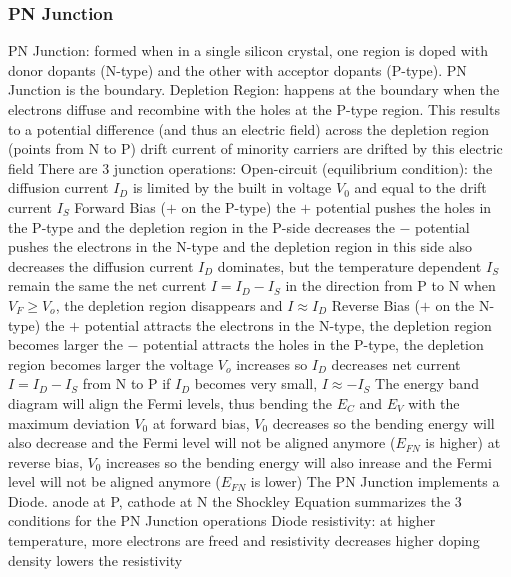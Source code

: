 \documentclass[a4paper,11pt]{article}
\begin{document}
 	\subsubsection{PN Junction}
 	\begin{outline}[enumerate]
 		\1 PN Junction: formed when in a single silicon crystal, one region is doped with donor dopants (N-type) and the other with acceptor dopants (P-type). PN Junction is the boundary.
 		\1 Depletion Region: happens at the boundary when the electrons diffuse and recombine with the holes at the P-type region. This results to a potential difference (and thus an electric field) across the depletion region (points from N to P)
 			\2 drift current of minority carriers are drifted by this electric field
 		\1 There are 3 junction operations:
 			\2 Open-circuit (equilibrium condition):
 				\3 the diffusion current $I_{D}$ is limited by the built in voltage $V_{0}$ and equal to the drift current $I_{S}$
 			\2 Forward Bias ($+$ on the P-type)
 				\3 the $+$ potential pushes the holes in the P-type and the depletion region in the P-side decreases 
 				\3 the $-$ potential pushes the electrons in the N-type and the depletion region in this side also decreases 
 				\3 the diffusion current $I_{D}$ dominates, but the temperature dependent $I_{S}$ remain the same
 				\3 the net current $I = I_{D} - I_{S}$ in the direction from P to N
 				\3 when $V_{F} \geq V_{o}$, the depletion region disappears and $I \approx I_{D}$
 			\2 Reverse Bias ($+$ on the N-type)
 				\3 the $+$ potential attracts the electrons in the N-type, the depletion region becomes larger
 				\3 the $-$ potential attracts the holes in the P-type, the depletion region becomes larger
 				\3 the voltage $V_{o}$ increases so $I_{D}$ decreases
 				\3 net current $I = I_{D} - I_{S}$ from N to P
 				\3 if $I_{D}$ becomes very small, $I \approx -I_{S}$	
 		\1 The energy band diagram will align the Fermi levels, thus bending the $E_{C}$ and $E_{V}$ with the maximum deviation $V_{0}$
 			\2 at forward bias, $V_{0}$ decreases so the bending energy will also decrease and the Fermi level will not be aligned anymore ($E_{FN}$ is higher) 
 			\2 at reverse bias, $V_{0}$ increases so the bending energy will also inrease and the Fermi level will not be aligned anymore ($E_{FN}$ is lower)
 		\1 The PN Junction implements a Diode. anode at P, cathode at N	
 			\2 the Shockley Equation summarizes the 3 conditions for the PN Junction operations
 			\2 Diode resistivity: 
 				\3 at higher temperature, more electrons are freed and resistivity decreases
 				\3 higher doping density lowers the resistivity
 	\end{outline}
	
\end{document}
